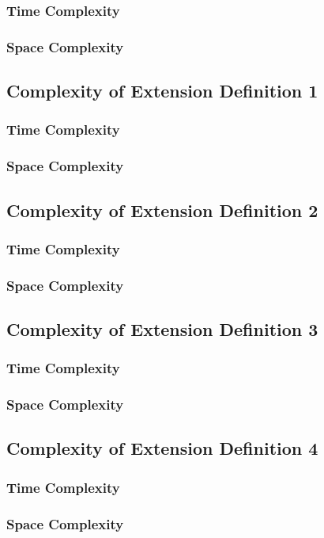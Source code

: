 \documentclass[conference]{IEEEtran}
\begin{document}
\subsubsection{Time Complexity}

\subsubsection{Space Complexity}

\subsection{Complexity of Extension Definition 1}

\subsubsection{Time Complexity}

\subsubsection{Space Complexity}

\subsection{Complexity of Extension Definition 2}

\subsubsection{Time Complexity}

\subsubsection{Space Complexity}

\subsection{Complexity of Extension Definition 3}

\subsubsection{Time Complexity}

\subsubsection{Space Complexity}

\subsection{Complexity of Extension Definition 4}

\subsubsection{Time Complexity}

\subsubsection{Space Complexity}

\end{document}
